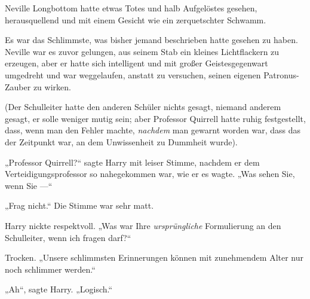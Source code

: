\later

Neville Longbottom hatte etwas Totes und halb Aufgelöstes gesehen, herausquellend und mit einem Gesicht wie ein zerquetschter Schwamm.

Es war das Schlimmste, was bisher jemand beschrieben hatte gesehen zu haben. Neville war es zuvor gelungen, aus seinem Stab ein kleines Lichtflackern zu erzeugen, aber er hatte sich intelligent und mit großer Geistesgegenwart umgedreht und war weggelaufen, anstatt zu versuchen, seinen eigenen Patronus-Zauber zu wirken.

(Der Schulleiter hatte den anderen Schüler nichts gesagt, niemand anderem gesagt, er solle weniger mutig sein; aber Professor Quirrell hatte ruhig festgestellt, dass, wenn man den Fehler machte, \emph{nachdem} man gewarnt worden war, dass das der Zeitpunkt war, an dem Unwissenheit zu Dummheit wurde).

„Professor Quirrell?“ sagte Harry mit leiser Stimme, nachdem er dem Verteidigungsprofessor so nahegekommen war, wie er es wagte.
„Was sehen Sie, wenn Sie —“

„Frag nicht.“ Die Stimme war sehr matt.

Harry nickte respektvoll.
„Was war Ihre \emph{ursprüngliche} Formulierung an den Schulleiter, wenn ich fragen darf?“

Trocken.
„Unsere schlimmsten Erinnerungen können mit zunehmendem Alter nur noch schlimmer werden.“

„Ah“, sagte Harry.
„Logisch.“

